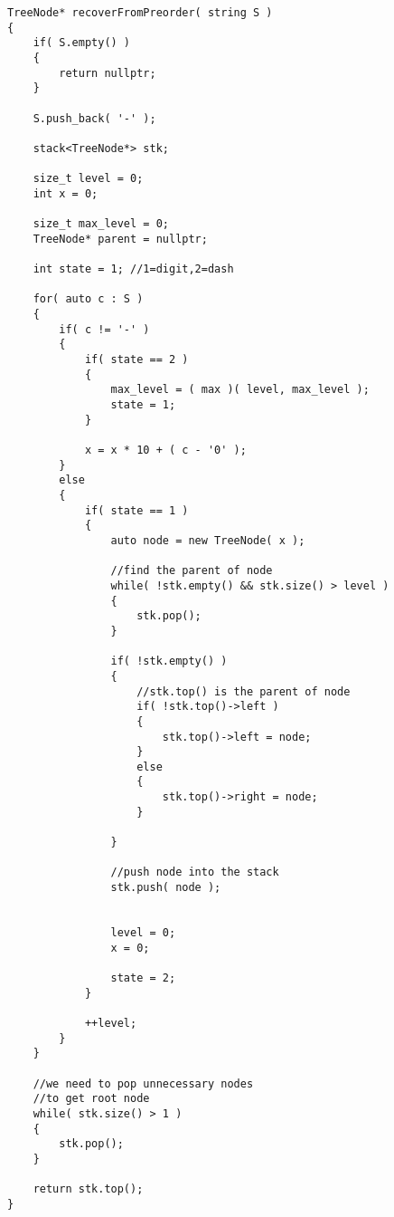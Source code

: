 \setcounter{lstlisting}{0}
\begin{lstlisting}[style=customc, caption={Stack}]
TreeNode* recoverFromPreorder( string S )
{
    if( S.empty() )
    {
        return nullptr;
    }

    S.push_back( '-' );

    stack<TreeNode*> stk;

    size_t level = 0;
    int x = 0;

    size_t max_level = 0;
    TreeNode* parent = nullptr;

    int state = 1; //1=digit,2=dash

    for( auto c : S )
    {
        if( c != '-' )
        {
            if( state == 2 )
            {
                max_level = ( max )( level, max_level );
                state = 1;
            }

            x = x * 10 + ( c - '0' );
        }
        else
        {
            if( state == 1 )
            {
                auto node = new TreeNode( x );

                //find the parent of node
                while( !stk.empty() && stk.size() > level )
                {
                    stk.pop();
                }

                if( !stk.empty() )
                {
                    //stk.top() is the parent of node
                    if( !stk.top()->left )
                    {
                        stk.top()->left = node;
                    }
                    else
                    {
                        stk.top()->right = node;
                    }

                }

                //push node into the stack
                stk.push( node );


                level = 0;
                x = 0;

                state = 2;
            }

            ++level;
        }
    }

    //we need to pop unnecessary nodes
    //to get root node
    while( stk.size() > 1 )
    {
        stk.pop();
    }

    return stk.top();
}
\end{lstlisting}